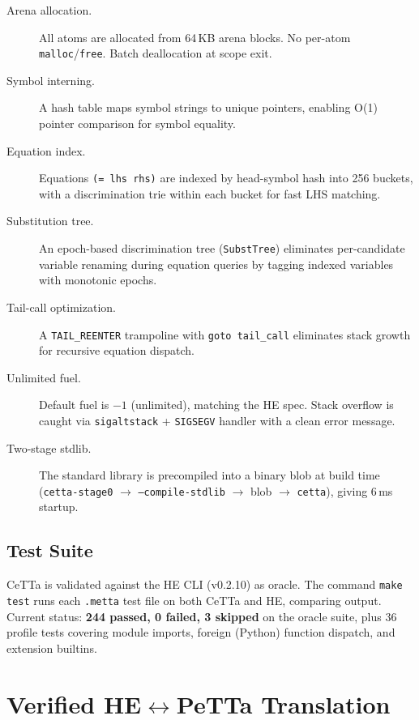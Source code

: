 \documentclass[11pt]{article}
\newcommand{\code}[1]{\texttt{#1}}
\newcommand{\PeTTa}{\textup{PeTTa}}
\newcommand{\HE}{\textup{HE}}
\newcommand{\CeTTa}{\textup{CeTTa}}
\begin{document}
\begin{description}
\item[Arena allocation.] All atoms are allocated from 64\,KB arena blocks.
  No per-atom \code{malloc}/\code{free}.  Batch deallocation at scope exit.
\item[Symbol interning.] A hash table maps symbol strings to unique
  pointers, enabling O(1) pointer comparison for symbol equality.
\item[Equation index.] Equations \code{(= lhs rhs)} are indexed by
  head-symbol hash into 256 buckets, with a discrimination trie within
  each bucket for fast LHS matching.
\item[Substitution tree.] An epoch-based discrimination tree
  (\code{SubstTree}) eliminates per-candidate variable renaming during
  equation queries by tagging indexed variables with monotonic epochs.
\item[Tail-call optimization.] A \code{TAIL\_REENTER} trampoline with
  \code{goto tail\_call} eliminates stack growth for recursive equation
  dispatch.
\item[Unlimited fuel.] Default fuel is $-1$ (unlimited), matching the
  \HE{} spec.  Stack overflow is caught via \code{sigaltstack} +
  \code{SIGSEGV} handler with a clean error message.
\item[Two-stage stdlib.] The standard library is precompiled into a
  binary blob at build time (\code{cetta-stage0} $\to$
  \code{--compile-stdlib} $\to$ blob $\to$ \code{cetta}), giving 6\,ms
  startup.
\end{description}

\subsection{Test Suite}

\CeTTa{} is validated against the \HE{} CLI (v0.2.10) as oracle.
The command \code{make test} runs each \code{.metta} test file on both
\CeTTa{} and \HE{}, comparing output.  Current status: \textbf{244
passed, 0 failed, 3 skipped} on the oracle suite, plus 36 profile
tests covering module imports, foreign (Python) function dispatch,
and extension builtins.

\section{Verified \HE{}$\leftrightarrow$\PeTTa{} Translation}
\end{document}

